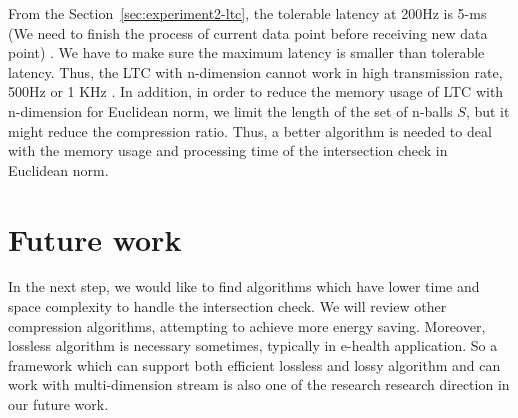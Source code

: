 From the Section~\ref{sec:experiment2-ltc}, the tolerable latency at 200Hz is
5-ms (We need to finish the process of current data point before receiving new
data point) . We have to make sure the maximum latency is smaller than tolerable
latency. Thus, the LTC with n-dimension cannot work in high transmission rate,
 500Hz or 1 KHz .  In addition, in order to reduce the memory usage of LTC
with n-dimension for Euclidean norm, we limit the length of the set of n-balls
$S$, but it might reduce the compression ratio. Thus, a better algorithm is
needed to deal with the memory usage and processing time of the intersection
check in Euclidean norm.

% 


\section{Future work}

In the next step, we would like to  find algorithms which have lower time and
space complexity to handle the intersection check. We will review other
compression algorithms, attempting to achieve more energy saving.  Moreover,
lossless algorithm is necessary sometimes, typically in e-health application. So
a framework which can support both efficient lossless and lossy algorithm and
can work with multi-dimension stream is also one of the research research
direction in our future work.
